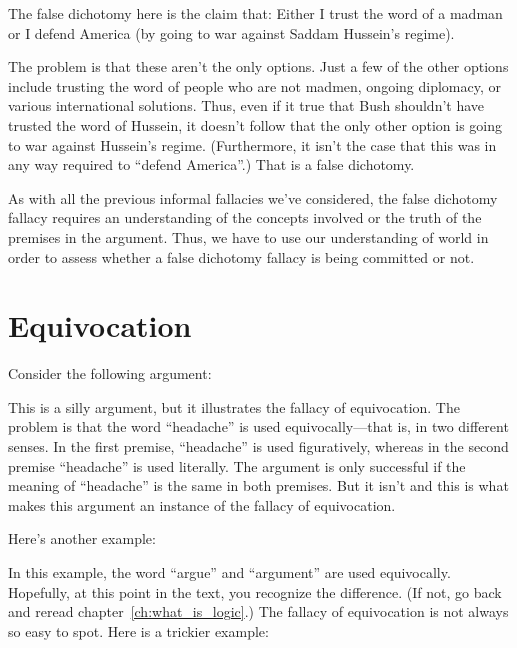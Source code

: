 The false dichotomy here is the claim that: Either I trust the word of a madman or I defend America (by going to war against Saddam Hussein's regime).

The problem is that these aren't the only options. Just a few of the other options include trusting the word of people who are not madmen, ongoing diplomacy, or various international solutions. Thus, even if it true that Bush shouldn't have trusted the word of Hussein, it doesn't follow that the only other option is going to war against Hussein's regime. (Furthermore, it isn't the case that this was in any way required to ``defend America''.) That is a false dichotomy.

As with all the previous informal fallacies we've considered, the false dichotomy fallacy requires an understanding of the concepts involved or the truth of the premises in the argument. Thus, we have to use our understanding of world in order to assess whether a false dichotomy fallacy is being committed or not.

\section{Equivocation}\label{sec:equivocation}

Consider the following argument:
\begin{kormanize}
\end{kormanize}

This is a silly argument, but it illustrates the fallacy of equivocation. The problem is that the word ``headache'' is used equivocally---that is, in two different senses. In the first premise, ``headache'' is used figuratively, whereas in the second premise ``headache'' is used literally. The argument is only successful if the meaning of ``headache'' is the same in both premises. But it isn't and this is what makes this argument an instance of the fallacy of equivocation.

Here's another example:
\begin{kormanize}
\end{kormanize}

In this example, the word ``argue'' and ``argument'' are used equivocally. Hopefully, at this point in the text, you recognize the difference. (If not, go back and reread chapter~\ref{ch:what_is_logic}.)
The fallacy of equivocation is not always so easy to spot. Here is a trickier example:

